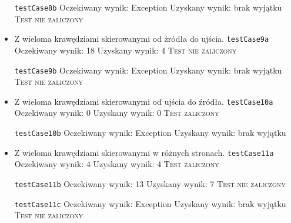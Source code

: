\begin{itemize}[nosep]
    \texttt{testCase8b}
    Oczekiwany wynik: Exception
    Uzyskany wynik: brak wyjątku
    \textsc{Test nie zaliczony}

    \item Z wieloma krawędziami skierowanymi od żródła do ujścia.
    \texttt{testCase9a}
    Oczekiwany wynik: 18
    Uzyskany wynik: 4
    \textsc{Test nie zaliczony}

    \texttt{testCase9b}
    Oczekiwany wynik: Exception
    Uzyskany wynik: brak wyjątku
    \textsc{Test nie zaliczony}

    \item Z wieloma krawędziami skierowanymi od ujścia do źródła.
    \texttt{testCase10a}
    Oczekiwany wynik: 0
    Uzyskany wynik: 0
    \textsc{Test zaliczony}

    \texttt{testCase10b}
    Oczekiwany wynik: Exception
    Uzyskany wynik: brak wyjątku


    \item Z wieloma krawędziami skierowanymi w różnych stronach.
    \texttt{testCase11a}
    Oczekiwany wynik: 4
    Uzyskany wynik: 4
    \textsc{Test zaliczony}

    \texttt{testCase11b}
    Oczekiwany wynik: 13
    Uzyskany wynik: 7
    \textsc{Test nie zaliczony}

    \texttt{testCase11c}
    Oczekiwany wynik: Exception
    Uzyskany wynik: brak wyjątku
    \textsc{Test nie zaliczony}


\end{itemize}


